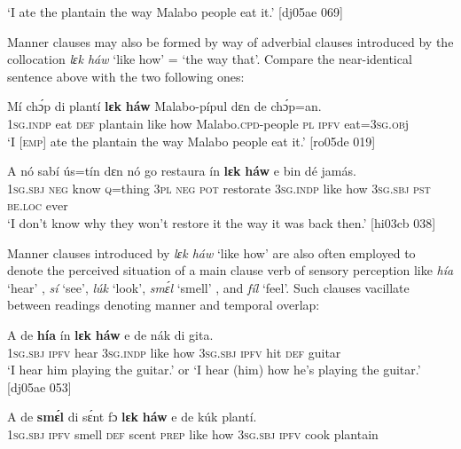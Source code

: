 \glt ‘I ate the plantain the way Malabo people eat it.’ [dj05ae 069]
\z

Manner clauses may also be formed by way of adverbial clauses introduced by the collocation \textit{lɛk háw} ‘like how’ = ‘the way that’. Compare the near-identical sentence above with the two following ones:


\ea%
    \label{ex:key:1481}
    \gll Mí    chɔ́p  di  plantí  \textbf{lɛk}  \textbf{háw}    Malabo-pípul      dɛn  de  chɔ́p=an.\\
\textsc{1sg.indp}   eat \textsc{def}   plantain  like  how    Malabo.\textsc{cpd}{}-people \textsc{pl}  \textsc{ipfv}  eat=\textsc{3sg.ob}j\\

\glt ‘I \textsc{[emp]} ate the plantain the way Malabo people eat it.’ [ro05de 019]
\z


\ea%
    \label{ex:key:1482}
    \gll A    nó  sabí    ús=tín  dɛn  nó  go  restaura    ín
\textbf{lɛk}  \textbf{háw}   e    bin  dé    jamás.\\
\textsc{1sg.sbj}  \textsc{neg}  know  \textsc{q}=thing  \textsc{3pl}  \textsc{neg}  \textsc{pot}  restorate    \textsc{3sg.indp}
like  how    \textsc{3sg.sbj}  \textsc{pst}  \textsc{be.loc}  ever\\

\glt ‘I don’t know why they won’t restore it the way it was back then.’ [hi03cb 038]
\z

Manner clauses introduced by \textit{lɛk háw} ‘like how’ are also often employed to denote the perceived situation of a main clause verb of sensory perception like \textit{hía} ‘hear’ , \textit{sí} ‘see’, \textit{lúk} ‘look’, \textit{smɛ́l} ‘smell’ , and \textit{fíl} ‘feel’. Such clauses vacillate between readings denoting manner and temporal overlap:


\ea%
    \label{ex:key:1483}
    \gll A    de  \textbf{hía}  ín    \textbf{lɛk}  \textbf{háw}    e    de  nák  di  gita.\\
\textsc{1sg.sbj}  \textsc{ipfv}  hear  \textsc{3sg.indp}  like  how    \textsc{3sg.sbj}  \textsc{ipfv}  hit  \textsc{def}  guitar\\

\glt ‘I hear him playing the guitar.’ or ‘I hear (him) how he’s playing the guitar.’ [dj05ae 053]
\z


\ea%
    \label{ex:key:1484}
    \gll A    de  \textbf{smɛ́l}    di  sɛ́nt    fɔ  \textbf{lɛk}  \textbf{háw}    e    de  kúk    plantí.\\
\textsc{1sg.sbj}  \textsc{ipfv}  smell  \textsc{def}  scent  \textsc{prep}  like  how    \textsc{3sg.sbj}  \textsc{ipfv}  cook  plantain\\

